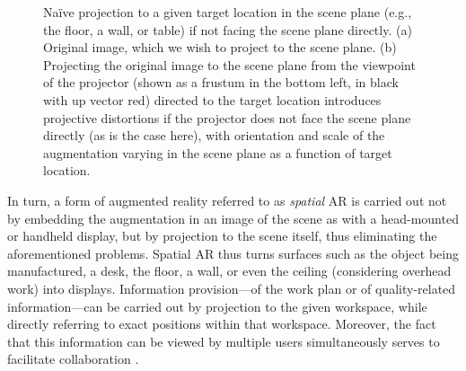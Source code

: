 \documentclass[review]{elsarticle}
\begin{document}
\begin{figure}[t]
    \centering
    \qquad
    \caption{Na\"ive projection to a given target location in the scene plane (e.g., the floor, a wall, or table) if not facing the scene plane directly. (a) Original image, which we wish to project to the scene plane. (b) Projecting the original image to the scene plane from the viewpoint of the projector (shown as a frustum in the bottom left, in black with up vector red) directed to the target location introduces projective distortions if the projector does not face the scene plane directly (as is the case here), with orientation and scale of the augmentation varying in the scene plane as a function of target location.}
    \label{fig:proj}
\end{figure}

In turn, a form of augmented reality referred to as \textit{spatial} AR\cite{bimber2019spatial} is carried out not by embedding the augmentation in an image of the scene as with a head-mounted or handheld display, but by projection to the scene itself, thus eliminating the aforementioned problems. Spatial AR thus turns surfaces such as the object being manufactured, a desk, the floor, a wall, or even the ceiling (considering overhead work) into displays. Information provision---of the work plan or of quality-related information---can be carried out by projection to the given workspace, while directly referring to exact positions within that workspace. Moreover, the fact that this information can be viewed by multiple users simultaneously serves to facilitate collaboration \cite{aschenbrenner2019comparing}.
\end{document}
